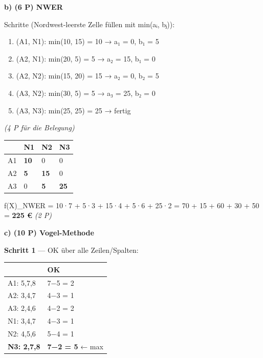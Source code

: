 \documentclass[11pt, a4paper]{article}
\begin{document}
\textbf{b) (6 P) NWER}

Schritte (Nordwest-leerste Zelle füllen mit min(aᵢ, bⱼ)):


\begin{enumerate}
  \item (A1, N1): min(10, 15) = 10 → a₁ = 0, b₁ = 5
  \item (A2, N1): min(20, 5) = 5 → a₂ = 15, b₁ = 0
  \item (A2, N2): min(15, 20) = 15 → a₂ = 0, b₂ = 5
  \item (A3, N2): min(30, 5) = 5 → a₃ = 25, b₂ = 0
  \item (A3, N3): min(25, 25) = 25 → fertig
\end{enumerate}

\textit{(4 P für die Belegung)}



{\small
\begin{tabularx}{\linewidth}{XXXX}
\hline
\rowcolor{tableheadbg}
{\color{white}\textbf{}} & {\color{white}\textbf{N1}} & {\color{white}\textbf{N2}} & {\color{white}\textbf{N3}} \\[2pt]
\hline
\endhead
\hline
\endfoot
A1 & \textbf{10} & 0 & 0 \\
A2 & \textbf{5} & \textbf{15} & 0 \\
A3 & 0 & \textbf{5} & \textbf{25} \\
\end{tabularx}
}


f(X)\_NWER = 10·7 + 5·3 + 15·4 + 5·6 + 25·2 = 70 + 15 + 60 + 30 + 50 = \textbf{225 €} \textit{(2 P)}


\textbf{c) (10 P) Vogel-Methode}


\textbf{Schritt 1} — OK über alle Zeilen/Spalten:



{\small
\begin{tabularx}{\linewidth}{XX}
\hline
\rowcolor{tableheadbg}
{\color{white}\textbf{}} & {\color{white}\textbf{OK}} \\[2pt]
\hline
\endhead
\hline
\endfoot
A1: 5,7,8 & 7−5 = 2 \\
A2: 3,4,7 & 4−3 = 1 \\
A3: 2,4,6 & 4−2 = 2 \\
N1: 3,4,7 & 4−3 = 1 \\
N2: 4,5,6 & 5−4 = 1 \\
\textbf{N3: 2,7,8} & \textbf{7−2 = 5} ← max \\
\end{tabularx}
}
\end{document}
